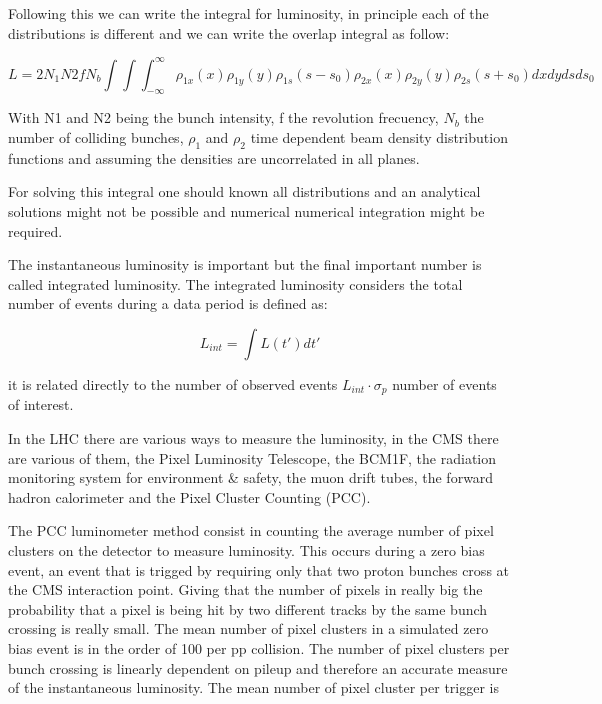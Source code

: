 Following this we can write the integral for luminosity, in principle each of the distributions is different and we can write the overlap integral as follow:

\begin{equation}
 L = 2N_{1}N{2}fN_{b} \int \int \int^{\infty}_{-\infty}  \rho_{1x} (x) \rho_{1y}(y) \rho_{1s} (s-s_{0}) \rho_{2x}(x) \rho_{2y}(y) \rho_{2s} (s+s_{0}) dxdydsds_{0}  
\end{equation}

With N1 and N2 being the bunch intensity, f the revolution frecuency, $N_{b}$ the number of colliding bunches, $\rho_{1}$ and $\rho_{2}$ time dependent beam density distribution functions and assuming the densities are uncorrelated in all planes.  \cite{Lumvdm}

For solving this integral one should known all distributions and an analytical solutions might not be possible and numerical numerical integration might be required.


The instantaneous luminosity is important  but the final important number is called integrated luminosity. The integrated luminosity considers the total number of events during a data period is defined as: 

\begin{equation}
 L_{int} = \int L (t') dt' 
\end{equation}

it is related directly to the number of observed events $L_{int} \cdot \sigma_{p}$ number of events of interest.


In the LHC there are various ways to measure the luminosity, in the CMS there are various of them, the Pixel Luminosity Telescope, the BCM1F, the radiation monitoring system for environment & safety, the muon drift tubes, the forward hadron calorimeter and the Pixel Cluster Counting (PCC). 

The PCC luminometer method consist in counting the average number of pixel clusters on the detector to measure luminosity. This occurs during a zero bias event, an event that is trigged by requiring only that two proton bunches cross at the CMS interaction point. Giving that the number of pixels in really big the probability that a pixel is being hit by two different tracks by the same bunch crossing is really small. The mean number of pixel clusters in a simulated zero bias event is in the order of 100 per pp collision. The number of pixel clusters per bunch crossing is linearly dependent on pileup and therefore an accurate measure of the instantaneous luminosity.\cite{PCC1} The mean number of pixel cluster per trigger is 


